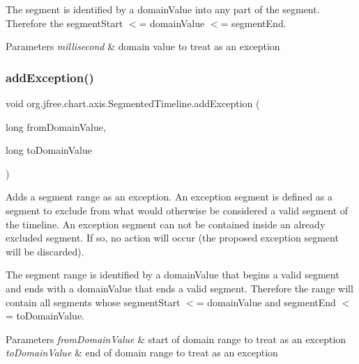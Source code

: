 The segment is identified by a domain\+Value into any part of the segment. Therefore the segment\+Start $<$= domain\+Value $<$= segment\+End.


\begin{DoxyParams}{Parameters}
{\em millisecond} & domain value to treat as an exception \\
\hline
\end{DoxyParams}
\mbox{\label{classorg_1_1jfree_1_1chart_1_1axis_1_1_segmented_timeline_a7c2bb5c8de74738997bc84f368845563}} 
\subsubsection{\texorpdfstring{add\+Exception()}{addException()}\hspace{0.1cm}{\footnotesize\ttfamily [2/3]}}
{\footnotesize\ttfamily void org.\+jfree.\+chart.\+axis.\+Segmented\+Timeline.\+add\+Exception (\begin{DoxyParamCaption}\item[{long}]{from\+Domain\+Value,  }\item[{long}]{to\+Domain\+Value }\end{DoxyParamCaption})}

Adds a segment range as an exception. An exception segment is defined as a segment to exclude from what would otherwise be considered a valid segment of the timeline. An exception segment can not be contained inside an already excluded segment. If so, no action will occur (the proposed exception segment will be discarded). 

The segment range is identified by a domain\+Value that begins a valid segment and ends with a domain\+Value that ends a valid segment. Therefore the range will contain all segments whose segment\+Start $<$= domain\+Value and segment\+End $<$= to\+Domain\+Value.


\begin{DoxyParams}{Parameters}
{\em from\+Domain\+Value} & start of domain range to treat as an exception \\
\hline
{\em to\+Domain\+Value} & end of domain range to treat as an exception \\
\hline
\end{DoxyParams}
\mbox{\label{classorg_1_1jfree_1_1chart_1_1axis_1_1_segmented_timeline_a667805b3155b5c6ce4857654fa01ed37}} 
